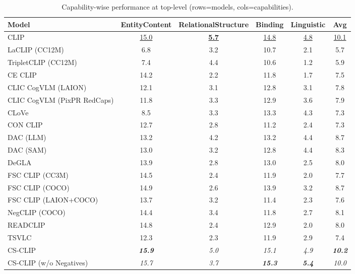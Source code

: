 \begin{table}[t]
  \centering
  \scriptsize
  \caption{Capability-wise performance at top-level (rows=models, cols=capabilities).}
  \label{tab:caps_top}
  \begin{adjustbox}{max width=\textwidth}
  \setlength{\tabcolsep}{2pt}
  \begin{tabular}{p{5.0cm}ccccc}
    \toprule
    Model & EntityContent & RelationalStructure & Binding & Linguistic & Avg \\
    \midrule
    CLIP & \underline{15.0} & \textbf{\underline{5.7}} & \underline{14.8} & \underline{4.8} & \underline{10.1} \\
    \midrule
    LaCLIP (CC12M) & 6.8 & 3.2 & 10.7 & 2.1 & 5.7 \\
    TripletCLIP (CC12M) & 7.4 & 4.4 & 10.6 & 1.2 & 5.9 \\
    \midrule
    CE CLIP & 14.2 & 2.2 & 11.8 & 1.7 & 7.5 \\
    CLIC CogVLM (LAION) & 12.1 & 3.1 & 12.8 & 3.1 & 7.8 \\
    CLIC CogVLM (PixPR RedCaps) & 11.8 & 3.3 & 12.9 & 3.6 & 7.9 \\
    CLoVe & 8.5 & 3.3 & 13.3 & 4.3 & 7.3 \\
    CON CLIP & 12.7 & 2.8 & 11.2 & 2.4 & 7.3 \\
    DAC (LLM) & 13.2 & 4.2 & 13.2 & 4.4 & 8.7 \\
    DAC (SAM) & 13.0 & 3.2 & 12.8 & 4.4 & 8.3 \\
    DeGLA & 13.9 & 2.8 & 13.0 & 2.5 & 8.0 \\
    FSC CLIP (CC3M) & 14.5 & 2.4 & 11.9 & 2.0 & 7.7 \\
    FSC CLIP (COCO) & 14.9 & 2.6 & 13.9 & 3.2 & 8.7 \\
    FSC CLIP (LAION+COCO) & 13.7 & 3.2 & 11.4 & 2.3 & 7.6 \\
    NegCLIP (COCO) & 14.4 & 3.4 & 11.8 & 2.7 & 8.1 \\
    READCLIP & 14.8 & 2.4 & 12.9 & 2.0 & 8.0 \\
    TSVLC & 12.3 & 2.3 & 11.9 & 2.9 & 7.4 \\
    \midrule
    CS-CLIP & \textbf{\emph{15.9}} & \emph{5.0} & \emph{15.1} & \emph{4.9} & \textbf{\emph{10.2}} \\
    CS-CLIP (w/o Negatives) & \emph{15.7} & \emph{3.7} & \textbf{\emph{15.3}} & \textbf{\emph{5.4}} & \emph{10.0} \\
    \bottomrule
  \end{tabular}
  \end{adjustbox}
\end{table}


